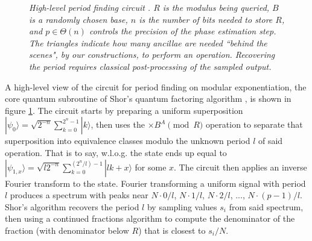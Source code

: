 \documentclass[twocolumn]{article}
\begin{document}
\begin{figure}
  \centering
  \caption{\em
	High-level period finding circuit \cite{Shor1999}.
	$R$ is the modulus being queried, $B$ is a randomly chosen base, $n$ is the number of bits needed to store $R$, and $p \in \Theta(n)$ controls the precision of the phase estimation step.
    The triangles indicate how many ancillae are needed ``behind the scenes", by our constructions, to perform an operation.
	Recovering the period requires classical post-processing of the sampled output.
  }
  \label{fig:period-finding}
\end{figure}

A high-level view of the circuit for period finding on modular exponentiation, the core quantum subroutine of Shor's quantum factoring algorithm \cite{Shor1999}, is shown in figure \ref{fig:period-finding}.
The circuit starts by preparing a uniform superposition $|\psi_0\rangle = \sqrt{2^{-n}} \sum_{k=0}^{2^n-1} |k\rangle$, then uses the $\times B^A {\pmod R}$ operation to separate that superposition into equivalence classes modulo the unknown period $l$ of said operation.
That is to say, w.l.o.g. the state ends up equal to $|\psi_{1,x}\rangle = \sqrt{l 2^{-n}} \sum_{k=0}^{(2^n/l)-1} |l k + x \rangle$ for some $x$.
The circuit then applies an inverse Fourier transform to the state.
Fourier transforming a uniform signal with period $l$ produces a spectrum with peaks near $N \cdot 0/l$, $N \cdot 1/l$, $N \cdot 2/l$, ..., $N \cdot (p-1)/l$.
Shor's algorithm recovers the period $l$ by sampling values $s_i$ from said spectrum, then using a continued fractions algorithm to compute the denominator of the fraction (with denominator below $R$) that is closest to $s_i/N$.
\end{document}
